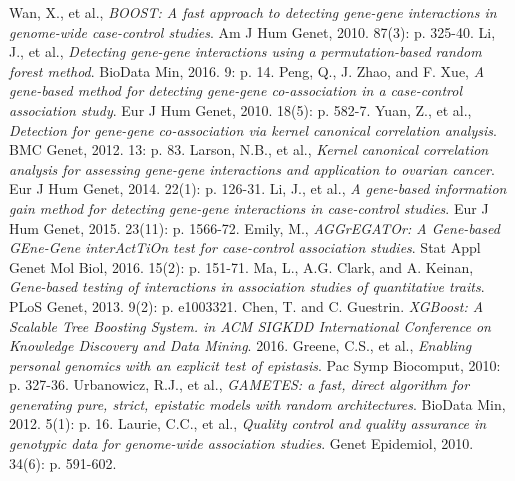 \documentclass[11pt]{article}
\theoremstyle{plain}
\theoremstyle{definition}
\theoremstyle{remark}
\begin{document}
\begin{thebibliography}{9}
Wan, X., et al., {\em BOOST: A fast approach to detecting gene-gene interactions in genome-wide case-control studies}. Am J Hum Genet, 2010. 87(3): p. 325-40.
Li, J., et al., {\em Detecting gene-gene interactions using a permutation-based random forest method}. BioData Min, 2016. 9: p. 14.
Peng, Q., J. Zhao, and F. Xue, {\em A gene-based method for detecting gene-gene co-association in a case-control association study}. Eur J Hum Genet, 2010. 18(5): p. 582-7.
Yuan, Z., et al., {\em Detection for gene-gene co-association via kernel canonical correlation analysis}. BMC Genet, 2012. 13: p. 83.
Larson, N.B., et al., {\em Kernel canonical correlation analysis for assessing gene-gene interactions and application to ovarian cancer}. Eur J Hum Genet, 2014. 22(1): p. 126-31.
Li, J., et al., {\em A gene-based information gain method for detecting gene-gene interactions in case-control studies}. Eur J Hum Genet, 2015. 23(11): p. 1566-72.
Emily, M., {\em AGGrEGATOr: A Gene-based GEne-Gene interActTiOn test for case-control association studies}. Stat Appl Genet Mol Biol, 2016. 15(2): p. 151-71.
Ma, L., A.G. Clark, and A. Keinan, {\em Gene-based testing of interactions in association studies of quantitative traits}. PLoS Genet, 2013. 9(2): p. e1003321.
Chen, T. and C. Guestrin. {\em XGBoost: A Scalable Tree Boosting System. in ACM SIGKDD International Conference on Knowledge Discovery and Data Mining}. 2016.
Greene, C.S., et al., {\em Enabling personal genomics with an explicit test of epistasis}. Pac Symp Biocomput, 2010: p. 327-36.
Urbanowicz, R.J., et al., {\em GAMETES: a fast, direct algorithm for generating pure, strict, epistatic models with random architectures}. BioData Min, 2012. 5(1): p. 16.
Laurie, C.C., et al., {\em Quality control and quality assurance in genotypic data for genome-wide association studies}. Genet Epidemiol, 2010. 34(6): p. 591-602.

\end{thebibliography}
\end{document}

